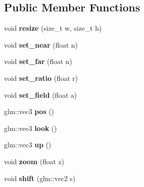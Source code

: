 \subsection*{\-Public \-Member \-Functions}
\begin{DoxyCompactItemize}
\item 
\hypertarget{classs9_1_1Camera_a6eff9242a0e38236d26c0b5b8934c23e}{void {\bfseries resize} (size\-\_\-t w, size\-\_\-t h)}\label{classs9_1_1Camera_a6eff9242a0e38236d26c0b5b8934c23e}

\item 
\hypertarget{classs9_1_1Camera_a187249f6840355e90385d77c07139541}{void {\bfseries set\-\_\-near} (float n)}\label{classs9_1_1Camera_a187249f6840355e90385d77c07139541}

\item 
\hypertarget{classs9_1_1Camera_a495b9d2c12ab823c3f0d5fc60ccd9037}{void {\bfseries set\-\_\-far} (float n)}\label{classs9_1_1Camera_a495b9d2c12ab823c3f0d5fc60ccd9037}

\item 
\hypertarget{classs9_1_1Camera_a1bb91a852163fe9ddf31468abcf0813e}{void {\bfseries set\-\_\-ratio} (float r)}\label{classs9_1_1Camera_a1bb91a852163fe9ddf31468abcf0813e}

\item 
\hypertarget{classs9_1_1Camera_a738b170a72c097cc5c834335f06dd641}{void {\bfseries set\-\_\-field} (float a)}\label{classs9_1_1Camera_a738b170a72c097cc5c834335f06dd641}

\item 
\hypertarget{classs9_1_1Camera_a03479cc99295b235cbab0c019e68660d}{glm\-::vec3 {\bfseries pos} ()}\label{classs9_1_1Camera_a03479cc99295b235cbab0c019e68660d}

\item 
\hypertarget{classs9_1_1Camera_a8a0711b866e4278587c0d2e65c0f510e}{glm\-::vec3 {\bfseries look} ()}\label{classs9_1_1Camera_a8a0711b866e4278587c0d2e65c0f510e}

\item 
\hypertarget{classs9_1_1Camera_a1e2bd41a35c04d3b067f81838fe97020}{glm\-::vec3 {\bfseries up} ()}\label{classs9_1_1Camera_a1e2bd41a35c04d3b067f81838fe97020}

\item 
\hypertarget{classs9_1_1Camera_ae3fe7ead9bd092788f2a6e03059d0c44}{void {\bfseries zoom} (float z)}\label{classs9_1_1Camera_ae3fe7ead9bd092788f2a6e03059d0c44}

\item 
\hypertarget{classs9_1_1Camera_a91f4d7b8eeead328fc7f7032ca65028d}{void {\bfseries shift} (glm\-::vec2 s)}\label{classs9_1_1Camera_a91f4d7b8eeead328fc7f7032ca65028d}


\end{DoxyCompactItemize}
